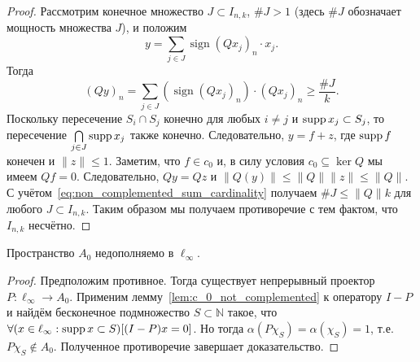\begin{proof}
	Рассмотрим конечное множество $J \subset I_{n,k}$,
	$\#J>1$ (здесь $\#J$ обозначает мощность множества $J$),
	и положим
	\begin{equation}
		y = \sum_{j \in J} \operatorname{sign}{(Qx_j)_n} \cdot x_j
		.
	\end{equation}
	Тогда
	\begin{equation}
		\label{eq:non_complemented_sum_cardinality}
		(Qy)_n = \sum_{j \in J}
		(\operatorname{sign}(Qx_j)_n)
		\cdot (Qx_j)_n \geq \frac{\# J}{k}
		.
	\end{equation}
	Поскольку пересечение $S_i \cap S_j$ конечно для любых $i \neq j$ и
	$\operatorname{supp} x_j \subset S_j$,
	то пересечение $\bigcap\limits_{j\in J} \operatorname{supp} x_j$ также конечно.
	Следовательно, $y = f + z$,
	где $\operatorname{supp} f$ конечен и $\|z\| \leq 1$.
	Заметим, что $f\in c_0$ и, в силу условия $c_0 \subseteq \ker Q$ мы имеем $Qf = 0$.
	Следовательно, $Qy = Qz$ и $\|Q(y)\| \leq \|Q\| \|z\| \leq \|Q\|$.
	С учётом~\eqref{eq:non_complemented_sum_cardinality} получаем $\# J \leq \|Q\| k$ для любого $J\subset I_{n,k}$.
	Таким образом мы получаем противоречие с тем фактом, что $I_{n,k}$ несчётно.
\end{proof}

\begin{theorem}
	Пространство $A_0$ недополняемо в $\ell_\infty$.
\end{theorem}

\begin{proof}
	Предположим противное.
	Тогда существует непрерывный проектор $P: \ell_\infty \to A_0$.
	Применим лемму~\ref{lem:c_0_not_complemented} к оператору $I-P$ и найдём бесконечное подмножество $S\subset\mathbb{N}$ такое,
	что $\forall(x\in\ell_\infty : \operatorname{supp} x \subset S)[(I-P)x = 0]$.
	Но тогда $\alpha(P\chi_S) = \alpha(\chi_S) = 1$, т.е. $P\chi_S \notin A_0$.
	Полученное противоречие завершает доказательство.
\end{proof}

